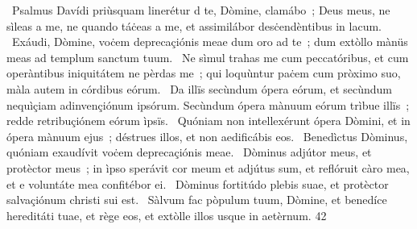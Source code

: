 {~Psalmus Davídi priùsquam linerétur}
{%
d te, Dòmine, clamábo~; Deus meus, ne sìleas a me, ne quando táċeas a me, et assimilábor desċendèntibus in lacum.
~Exáudi, Dòmine, voċem deprecaçiónis meae dum oro ad te~; dum extòllo mànüs meas ad templum sanctum tuum.
~Ne sìmul trahas me cum peccatóribus, et cum operàntibus iniquitátem ne pèrdas me~; qui loquùntur paċem cum pròximo suo, màla autem in córdibus eórum.
~Da illïs secùndum ópera eórum, et secùndum nequìçiam adinvençiónum ipsórum. Secùndum ópera mànuum eórum trìbue illïs~; redde retribuçiónem eórum ìpsïs.
~Quóniam non intellexérunt ópera Dòmini, et in ópera mànuum ejus~; déstrues illos, et non aedificábis eos.
~Benedìctus Dòminus, quóniam exaudívit voċem deprecaçiónis meae.
~Dòminus adjútor meus, et protèctor meus~; in ìpso sperávit cor meum et adjútus sum, et reflóruit càro mea, et e voluntáte mea confitébor ei.
~Dòminus fortitúdo plebis suae, et protèctor salvaçiónum christi sui est.
~Sàlvum fac pòpulum tuum, Dòmine, et benedíce hereditáti tuae, et rège eos, et extòlle illos usque in aetèrnum.}
{4}{2}
